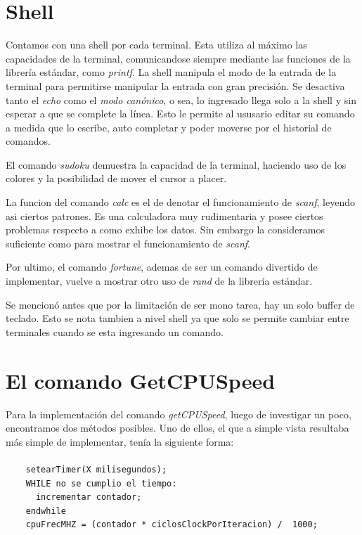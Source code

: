 \documentclass[a4paper,10pt]{article}
\begin{document}
\section{Shell}
    Contamos con una shell por cada terminal.
    Esta utiliza al máximo las capacidades de la terminal, comunicandose siempre mediante las funciones de la librería estándar, como \textit{printf}.
    La shell manipula el modo de la entrada de la terminal para permitirse manipular la entrada con gran precisión.
    Se desactiva tanto el \textit{echo} como el \textit{modo canónico}, o sea, lo ingresado llega solo a la shell y sin esperar a que se complete la línea.
    Esto le permite al ususario editar su comando a medida que lo escribe, auto completar y poder moverse por el historial de comandos.

    El comando \textit{sudoku} demuestra la capacidad de la terminal, haciendo uso de los colores y la posibilidad de mover el cursor a placer.
    
    La funcion del comando \textit{calc} es el de denotar el funcionamiento de \textit{scanf}, leyendo asi ciertos patrones.
    Es una calculadora muy rudimentaria y posee ciertos problemas respecto a como exhibe los datos.
    Sin embargo la consideramos suficiente como para mostrar el funcionamiento de \textit{scanf}.
    
    Por ultimo, el comando \textit{fortune}, ademas de ser un comando divertido de implementar, vuelve a mostrar otro uso de \textit{rand} de la librería estándar.

    Se mencionó antes que por la limitación de ser mono tarea, hay un solo buffer de teclado.
    Esto se nota tambien a nivel shell ya que solo se permite cambiar entre terminales cuando se esta ingresando un comando.

\newpage
\section{El comando GetCPUSpeed}
    Para la implementación del comando \textit{getCPUSpeed}, luego de investigar un poco, encontramos dos métodos posibles. Uno de ellos, el que a simple vista resultaba
    más simple de implementar, tenía la siguiente forma:
    \paragraph*{}
    \begin{lstlisting}
    setearTimer(X milisegundos);
    WHILE no se cumplio el tiempo:
	  incrementar contador;
    endwhile
    cpuFrecMHZ = (contador * ciclosClockPorIteracion) /  1000;
    \end{lstlisting}
\end{document}
